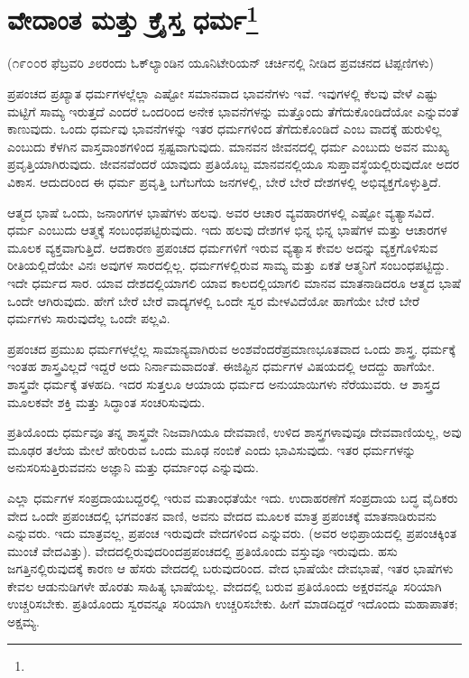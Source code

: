 
\chapter[ವೇದಾಂತ ಮತ್ತು ಕ್ರೈಸ್ತ ಧರ್ಮ]{ವೇದಾಂತ ಮತ್ತು ಕ್ರೈಸ್ತ ಧರ್ಮ\protect\footnote{}}

\begin{center}
(೧೯೦೦ರ ಫೆಬ್ರವರಿ ೨೮ರಂದು ಓಕ್‌ಲ್ಯಾಂಡಿನ ಯೂನಿಟೇರಿಯನ್ ಚರ್ಚಿನಲ್ಲಿ ನೀಡಿದ ಪ್ರವಚನದ ಟಿಪ್ಪಣಿಗಳು)
\end{center}

ಪ್ರಪಂಚದ ಪ್ರಖ್ಯಾತ ಧರ್ಮಗಳಲ್ಲೆಲ್ಲಾ ಎಷ್ಟೋ ಸಮಾನವಾದ ಭಾವನೆಗಳು ಇವೆ. ಇವುಗಳಲ್ಲಿ ಕೆಲವು ವೇಳೆ ಎಷ್ಟು ಮಟ್ಟಿಗೆ ಸಾಮ್ಯ ಇರುತ್ತದೆ ಎಂದರೆ ಒಂದರಿಂದ ಅನೇಕ ಭಾವನೆಗಳನ್ನು ಮತ್ತೊಂದು ತೆಗೆದುಕೊಂಡಿದೆಯೋ ಎನ್ನುವಂತೆ ಕಾಣುವುದು. ಒಂದು ಧರ್ಮವು ಭಾವನೆಗಳನ್ನು ಇತರ ಧರ್ಮಗಳಿಂದ ತೆಗೆದುಕೊಂಡಿದೆ ಎಂಬ ವಾದಕ್ಕೆ ಹುರುಳಿಲ್ಲ ಎಂಬುದು ಕೆಳಗಿನ ವಾಸ್ತವಾಂಶಗಳಿಂದ ಸ್ಪಷ್ಟವಾಗುವುದು. ಮಾನವನ ಜೀವನದಲ್ಲಿ ಧರ್ಮ ಎಂಬುದು ಅವನ ಮುಖ್ಯ ಪ್ರವೃತ್ತಿಯಾಗಿರುವುದು. ಜೀವನವೆಂದರೆ ಯಾವುದು ಪ್ರತಿಯೊಬ್ಬ ಮಾನವನಲ್ಲಿಯೂ ಸುಪ್ತಾವಸ್ಥೆಯಲ್ಲಿರುವುದೋ ಅದರ ವಿಕಾಸ. ಆದುದರಿಂದ ಈ ಧರ್ಮ ಪ್ರವೃತ್ತಿ ಬಗೆಬಗೆಯ ಜನಗಳಲ್ಲಿ, ಬೇರೆ ಬೇರೆ ದೇಶಗಳಲ್ಲಿ ಅಭಿವ್ಯಕ್ತಗೊಳ್ಳುತ್ತಿದೆ.

ಆತ್ಮದ ಭಾಷೆ ಒಂದು, ಜನಾಂಗಗಳ ಭಾಷೆಗಳು ಹಲವು. ಅವರ ಆಚಾರ ವ್ಯವಹಾರಗಳಲ್ಲಿ ಎಷ್ಟೋ ವ್ಯತ್ಯಾಸವಿದೆ. ಧರ್ಮ ಎಂಬುದು ಆತ್ಮಕ್ಕೆ ಸಂಬಂಧಪಟ್ಟಿರುವುದು. ಇದು ಹಲವು ದೇಶಗಳ ಭಿನ್ನ ಭಿನ್ನ ಭಾಷೆಗಳ ಮತ್ತು ಆಚಾರಗಳ ಮೂಲಕ ವ್ಯಕ್ತವಾಗುತ್ತಿದೆ. ಆದಕಾರಣ ಪ್ರಪಂಚದ ಧರ್ಮಗಳಿಗೆ ಇರುವ ವ್ಯತ್ಯಾಸ ಕೇವಲ ಅದನ್ನು ವ್ಯಕ್ತಗೊಳಿಸುವ ರೀತಿಯಲ್ಲಿದೆಯೇ ವಿನಃ ಅವುಗಳ ಸಾರದಲ್ಲಿಲ್ಲ. ಧರ್ಮಗಳಲ್ಲಿರುವ ಸಾಮ್ಯ ಮತ್ತು ಏಕತೆ ಆತ್ಮನಿಗೆ ಸಂಬಂಧಪಟ್ಟಿದ್ದು. ಇದೇ ಧರ್ಮದ ಸಾರ. ಯಾವ ದೇಶದಲ್ಲಿಯಾಗಲಿ ಯಾವ ಕಾಲದಲ್ಲಿಯಾಗಲಿ ಮಾನವ ಮಾತನಾಡಿದರೂ ಆತ್ಮದ ಭಾಷೆ ಒಂದೇ ಆಗಿರುವುದು. ಹೇಗೆ ಬೇರೆ ಬೇರೆ ವಾದ್ಯಗಳಲ್ಲಿ ಒಂದೇ ಸ್ವರ ಮೇಳವಿದೆಯೋ ಹಾಗೆಯೇ ಬೇರೆ ಬೇರೆ ಧರ್ಮಗಳು ಸಾರುವುದೆಲ್ಲ ಒಂದೇ ಪಲ್ಲವಿ.

ಪ್ರಪಂಚದ ಪ್ರಮುಖ ಧರ್ಮಗಳಲ್ಲೆಲ್ಲ ಸಾಮಾನ್ಯವಾಗಿರುವ ಅಂಶವೆಂದರೆ\break ಪ್ರಮಾಣಭೂತವಾದ ಒಂದು ಶಾಸ್ತ್ರ. ಧರ್ಮಕ್ಕೆ ಇಂತಹ ಶಾಸ್ತ್ರವಿಲ್ಲದೆ ಇದ್ದರೆ ಅದು ನಿರ್ನಾಮವಾದಂತೆ. ಈಜಿಪ್ಟಿನ ಧರ್ಮಗಳ ವಿಷಯದಲ್ಲಿ ಆದದ್ದು ಹಾಗೆಯೇ. ಶಾಸ್ತ್ರವೇ ಧರ್ಮಕ್ಕೆ ತಳಹದಿ. ಇದರ ಸುತ್ತಲೂ ಆಯಾಯ ಧರ್ಮದ ಅನುಯಾಯಿಗಳು ನೆರೆಯುವರು. ಆ ಶಾಸ್ತ್ರದ ಮೂಲಕವೇ ಶಕ್ತಿ ಮತ್ತು ಸಿದ್ಧಾಂತ ಸಂಚರಿಸುವುದು.

ಪ್ರತಿಯೊಂದು ಧರ್ಮವೂ ತನ್ನ ಶಾಸ್ತ್ರವೇ ನಿಜವಾಗಿಯೂ ದೇವವಾಣಿ, ಉಳಿದ ಶಾಸ್ತ್ರಗಳಾವುವೂ ದೇವವಾಣಿಯಲ್ಲ, ಅವು ಮೂಢರ ತಲೆಯ ಮೇಲೆ ಹೇರಿರುವ ಒಂದು ಮೂಢ ನಂಬಿಕೆ ಎಂದು ಭಾವಿಸುವುದು. ಇತರ ಧರ್ಮಗಳನ್ನು ಅನುಸರಿಸುತ್ತಿರುವವನು ಅಜ್ಞಾನಿ ಮತ್ತು ಧರ್ಮಾಂಧ ಎನ್ನುವುದು.

ಎಲ್ಲಾ ಧರ್ಮಗಳ ಸಂಪ್ರದಾಯಬದ್ದರಲ್ಲಿ ಇರುವ ಮತಾಂಧತೆಯೇ ಇದು. ಉದಾಹರಣೆಗೆ ಸಂಪ್ರದಾಯ ಬದ್ಧ ವೈದಿಕರು ವೇದ ಒಂದೇ ಪ್ರಪಂಚದಲ್ಲಿ ಭಗವಂತನ ವಾಣಿ, ಅವನು ವೇದದ ಮೂಲಕ ಮಾತ್ರ ಪ್ರಪಂಚಕ್ಕೆ ಮಾತನಾಡಿರುವನು ಎನ್ನುವರು. ಇದು ಮಾತ್ರವಲ್ಲ, ಪ್ರಪಂಚ ಇರುವುದೇ ವೇದಗಳಿಂದ ಎನ್ನುವರು. (ಅವರ ಅಭಿಪ್ರಾಯದಲ್ಲಿ ಪ್ರಪಂಚಕ್ಕಿಂತ ಮುಂಚೆ ವೇದವಿತ್ತು). ವೇದದಲ್ಲಿರುವುದರಿಂದ\break ಪ್ರಪಂಚದಲ್ಲಿ ಪ್ರತಿಯೊಂದು ವಸ್ತುವೂ ಇರುವುದು. ಹಸು ಜಗತ್ತಿನಲ್ಲಿರುವುದಕ್ಕೆ ಕಾರಣ ಆ ಹೆಸರು ವೇದದಲ್ಲಿ ಬರುವುದರಿಂದ. ವೇದ ಭಾಷೆಯೇ ದೇವಭಾಷೆ, ಇತರ ಭಾಷೆಗಳು ಕೇವಲ ಆಡುನುಡಿಗಳೇ ಹೊರತು ಸಾಹಿತ್ಯ ಭಾಷೆಯಲ್ಲ. ವೇದದಲ್ಲಿ ಬರುವ ಪ್ರತಿಯೊಂದು ಅಕ್ಷರವನ್ನೂ ಸರಿಯಾಗಿ ಉಚ್ಚರಿಸಬೇಕು. ಪ್ರತಿಯೊಂದು ಸ್ವರವನ್ನೂ ಸರಿಯಾಗಿ ಉಚ್ಚರಿಸಬೇಕು. ಹೀಗೆ ಮಾಡದಿದ್ದರೆ ಇದೊಂದು ಮಹಾಪಾತಕ; ಅಕ್ಷಮ್ಯ.

